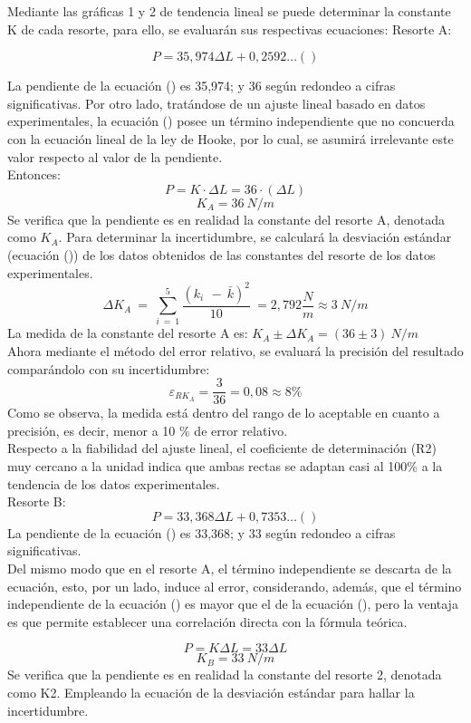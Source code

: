 \documentclass[../main.tex]{subfiles}
\begin{document}
Mediante las gráficas 1 y 2 de tendencia lineal se puede determinar la
constante K de cada resorte, para ello, se evaluarán sus respectivas ecuaciones:
Resorte A:

\[P=35,974 \Delta  L +0,2592…()\]

La pendiente de la ecuación () es 35,974; y 36 según redondeo a cifras significativas. 
Por otro lado, tratándose de un ajuste lineal basado en datos experimentales, la ecuación () 
posee un término independiente que no concuerda con la ecuación lineal de la ley de
Hooke, por lo cual, se asumirá irrelevante este valor respecto al valor de la pendiente.\\
Entonces:
\[P = K \cdot \Delta L = 36 \cdot (\Delta L) \]
\[K_A=36\ N/m\]
Se verifica que la pendiente es en realidad la constante del resorte A, denotada como 
$K_A$.
Para determinar la incertidumbre, se calculará la desviación estándar (ecuación ()) de los
datos obtenidos de las constantes del resorte de los datos experimentales.
\[\Delta K_A\ =\ \sum_{i\ =\ 1}^{5}\frac{{(k_{i\ }\ -\ \bar{k})}^2}{10}\ =2,792\frac{N}{m}\approx3\ N/m\]
La medida de la constante del resorte A es: $K_A \pm \Delta K_A=(36\pm 3)\ N/m$\\
Ahora mediante el método del error relativo, se evaluará la precisión del resultado comparándolo con su incertidumbre:
\[\varepsilon_{RK_A} = \frac{3}{36} = 0,08 \approx 8\%\]
Como se observa, la medida está dentro del rango de lo aceptable en cuanto a precisión, 
es decir, menor a 10 \% de error relativo.\\
Respecto a la fiabilidad del ajuste lineal, el coeficiente de determinación (R2) muy 
cercano a la unidad indica que ambas rectas se adaptan casi al 100\% a la tendencia
de los datos experimentales.\\
Resorte B:
\[P=33,368 \Delta L+0,7353…()\]
La pendiente de la ecuación () es 33,368; y 33 según redondeo a cifras significativas. \\
Del mismo modo que en el resorte A, el término independiente se descarta de la 
ecuación, esto, por un lado, induce al error, considerando, además, que el término
independiente de la ecuación () es mayor que el de la ecuación (),
pero la ventaja es que permite establecer una correlación directa con la fórmula teórica.

\[P=K \Delta L=33 \Delta L\]
\[K_B=33\ N/m\]
Se verifica que la pendiente es en realidad la constante del resorte 2, denotada como K2.
Empleando la ecuación de la desviación estándar para hallar la incertidumbre.
\end{document}
